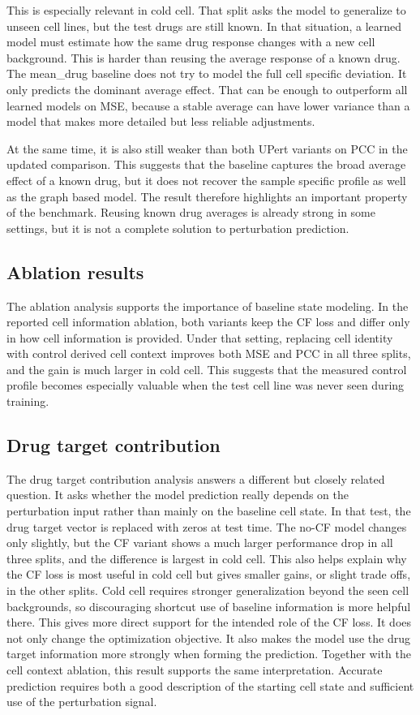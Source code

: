 \noindent This is especially relevant in cold cell. That split asks the model to generalize to unseen cell lines, but the test drugs are still known. In that situation, a learned model must estimate how the same drug response changes with a new cell background. This is harder than reusing the average response of a known drug. The mean\_drug baseline does not try to model the full cell specific deviation. It only predicts the dominant average effect. That can be enough to outperform all learned models on MSE, because a stable average can have lower variance than a model that makes more detailed but less reliable adjustments.

\noindent At the same time, it is also still weaker than both UPert variants on PCC in the updated comparison. This suggests that the baseline captures the broad average effect of a known drug, but it does not recover the sample specific profile as well as the graph based model. The result therefore highlights an important property of the benchmark. Reusing known drug averages is already strong in some settings, but it is not a complete solution to perturbation prediction.

\subsection{Ablation results}
\noindent The ablation analysis supports the importance of baseline state modeling. In the reported cell information ablation, both variants keep the CF loss and differ only in how cell information is provided. Under that setting, replacing cell identity with control derived cell context improves both MSE and PCC in all three splits, and the gain is much larger in cold cell. This suggests that the measured control profile becomes especially valuable when the test cell line was never seen during training.

\subsection{Drug target contribution}
\noindent The drug target contribution analysis answers a different but closely related question. It asks whether the model prediction really depends on the perturbation input rather than mainly on the baseline cell state. In that test, the drug target vector is replaced with zeros at test time. The no-CF model changes only slightly, but the CF variant shows a much larger performance drop in all three splits, and the difference is largest in cold cell. This also helps explain why the CF loss is most useful in cold cell but gives smaller gains, or slight trade offs, in the other splits. Cold cell requires stronger generalization beyond the seen cell backgrounds, so discouraging shortcut use of baseline information is more helpful there. This gives more direct support for the intended role of the CF loss. It does not only change the optimization objective. It also makes the model use the drug target information more strongly when forming the prediction. Together with the cell context ablation, this result supports the same interpretation. Accurate prediction requires both a good description of the starting cell state and sufficient use of the perturbation signal.

